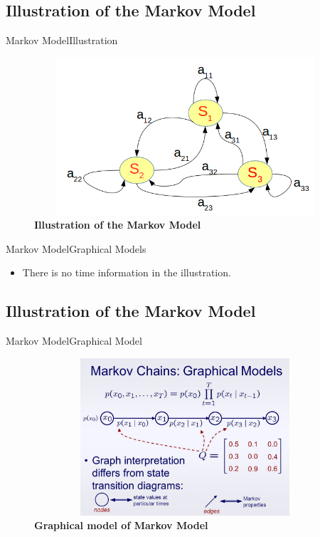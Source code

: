 \documentclass[10pt]{beamer}
\begin{document}
\subsection{Illustration of the Markov Model}
\begin{frame}{Markov Model}{Illustration}
  \begin{figure}[h]
    \centering
    \includegraphics[width=4.5in,height=2.3in]{figures/illustration_markov_model.png}
    \caption {\textbf{Illustration of the Markov Model}}
  \end{figure}
\end{frame}

\begin{frame}{Markov Model}{Graphical Models}
  \begin{itemize}
      \item There is no time information in the illustration.
  \end{itemize}
\end{frame}

\subsection{Illustration of the Markov Model}
\begin{frame}{Markov Model}{Graphical Model}
  \begin{figure}[h]
    \centering
    \includegraphics[width=4.6in,height=2.3in]{figures/graphical_models.png}
    \caption {\textbf{Graphical model of Markov Model}}
  \end{figure}
\end{frame}
\end{document}

